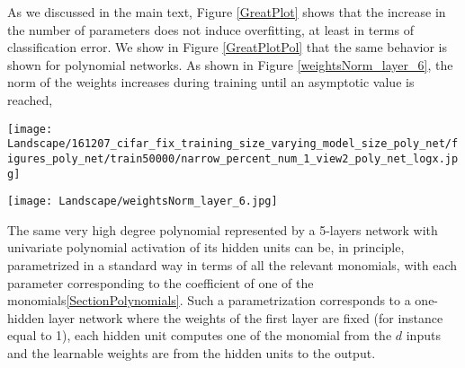 \documentclass[10pt]{article}
\begin{document}
As we discussed in the main text, Figure \ref{GreatPlot} shows that
the increase in the number of parameters does not induce overfitting,
at least in terms of classification error.  We show in Figure
\ref{GreatPlotPol} that the same behavior is shown for polynomial
networks.  As shown in Figure \ref{weightsNorm_layer_6}, the norm of
the weights increases during training until an asymptotic value is
reached,



\begin{figure*}[h!]\centering
\texttt{[image: Landscape/161207\_cifar\_fix\_training\_size\_varying\_model\_size\_poly\_net/figures\_poly\_net/train50000/narrow\_percent\_num\_1\_view2\_poly\_net\_logx.jpg]}
\caption{\it The previous figures show dependence on $N$ -- number of
  training examples -- for a fixed architecture with $W$ parameters.
  This figure shows dependence on $W$ for a fixed training set with
  $N$ examples. The network is again a 5-layer all convolutional
  polynomial network. All hidden layers have the same number of
  channels. Neither data augmentation nor regularization is
  performed. The classical theory explains the generalization behavior
  on the left; the challenge is to explain the lack of overfitting for
  $W>n$. As shown here, there is zero
  error for $W \ge n$.}
\label{GreatPlotPol}
\end{figure*}







\begin{figure*}[h!]\centering
\texttt{[image: Landscape/weightsNorm\_layer\_6.jpg]}
\caption{\it The norm of the weights increases with training epochs of
  SGD until a certain level after which it does not change
  anymore. The behaviour shown here is typical for all layers for CIFAR-10.}
\label{weightsNorm_layer_6}
\end{figure*}


The same very high degree polynomial represented by a 5-layers network
with univariate polynomial activation of its hidden units can be, in
principle, parametrized in a standard way in terms of all the relevant
monomials, with each parameter corresponding to the coefficient of one
of the monomials\ref{SectionPolynomials}. Such a parametrization
corresponds to a one-hidden layer network where the weights of the
first layer are fixed (for instance equal to 1), each hidden unit
computes one of the monomial from the $d$ inputs and the learnable
weights are from the hidden units to the output.
\end{document}
